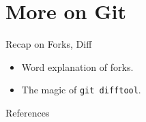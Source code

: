 %
\section{More on Git}
\label{sec:more_on_git_forks}

\begin{frame}[fragile]{Recap on Forks, Diff}
  \begin{itemize}[<+- | alert@+>]
    \item Word explanation of forks.
    \item The magic of \texttt{git difftool}.
  \end{itemize}
\end{frame}

%

\begin{frame}[allowframebreaks]{References}
  
  
\end{frame}



